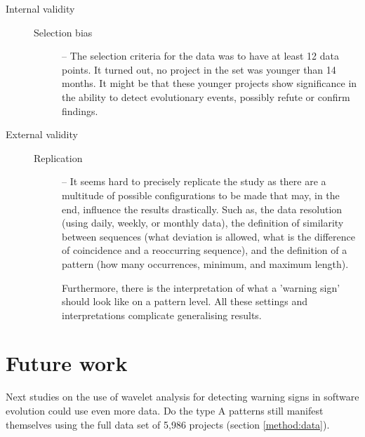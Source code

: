 \begin{description}
\begin{description}
\begin{comment}
		\item[Sample size.] \hspace{1em} For this study, a set of 250 projects is
			used. Is this enough to generalise the results to the world of OSS projects.

		\item[Time resolution.] \hspace{1em} Is monthly aggregated data fine-grained
			enough?
	\end{comment}
	\end{description}

	\item[Internal validity] \hfill

	\begin{description}
		\item[\rm{Selection bias}] -- The selection criteria for the data was to have
			at least 12 data points. It turned out, no project in the set was younger
			than 14 months. It might be that these younger projects show significance in
			the ability to detect evolutionary events, possibly refute or confirm
			findings.
	\end{description}

	\item[External validity] \hfill

	\begin{description}
		\item[\rm{Replication}] -- It seems hard to precisely replicate the study
			as there are a multitude of possible configurations to be made that may, in
			the end, influence the results drastically. Such as, the data resolution
			(using daily, weekly, or monthly data), the definition of similarity between
			sequences (what deviation is allowed, what is the difference of coincidence
			and a reoccurring sequence), and the definition of a pattern (how many
			occurrences, minimum, and maximum length).
			
			Furthermore, there is the interpretation of what a 'warning sign' should
			look like on a pattern level. All these settings and interpretations
			complicate generalising results.
	\end{description}
\end{description}

\section{Future work}
Next studies on the use of wavelet analysis for detecting warning signs in
software evolution could use even more data. Do the type A patterns still
manifest themselves using the full data set of 5,986 projects (section
\ref{method:data}).

